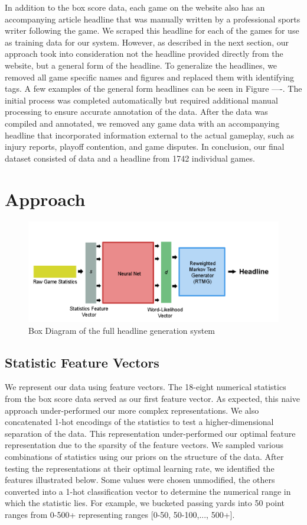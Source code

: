 \documentclass[12pt, journal]{IEEEtran}
\begin{document}
In addition to the box score data, each game on the website also has an accompanying article headline that was manually written by a professional sports writer following the game. We scraped this headline for each of the games for use as training data for our system. However, as described in the next section, our approach took into consideration not the headline provided directly from the website, but a general form of the headline. To generalize the headlines, we removed all game specific names and figures and replaced them with identifying tags. A few examples of the general form headlines can be seen in Figure ----. The initial process was completed automatically but required additional manual processing to ensure accurate annotation of the data. After the data was compiled and annotated, we removed any game data with an accompanying headline that incorporated information external to the actual gameplay, such as injury reports, playoff contention, and game disputes. In conclusion, our final dataset consisted of data and a headline from 1742 individual games.


\section{Approach}

\begin{figure}[t]
\centering
\includegraphics[width=7in]{model_graph.png}
\caption{Box Diagram of the full headline generation system}
\label{model_graph}
\end{figure}

\subsection{Statistic Feature Vectors}
We represent our data using feature vectors. The 18-eight numerical statistics from the box score data served as our first feature vector. As expected, this naive approach under-performed our more complex representations. We also concatenated 1-hot encodings of the statistics to test a higher-dimensional separation of the data. This representation under-performed our optimal feature representation due to the sparsity of the feature vectors. We sampled various combinations of statistics using our priors on the structure of the data. After testing the representations at their optimal learning rate, we identified the features illustrated below. Some values were chosen unmodified, the others converted into a 1-hot classification vector to determine the numerical range in which the statistic lies. For example, we bucketed passing yards into 50 point ranges from 0-500+ representing ranges [0-50, 50-100,..., 500+]. 
\end{document}
